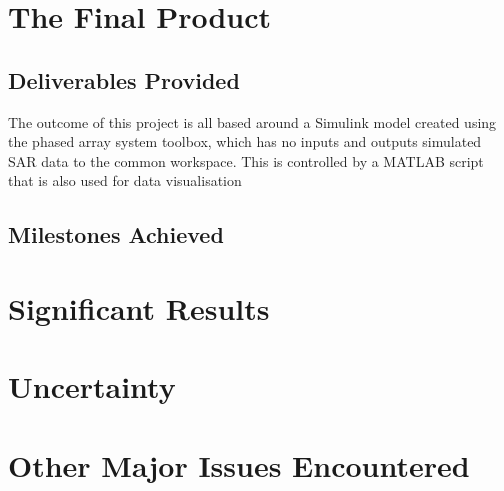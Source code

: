 \section{The Final Product}
\subsection{Deliverables Provided}
The outcome of this project is all based around a Simulink model created using the phased array system toolbox, which has no inputs and outputs simulated SAR data to the common workspace. This is controlled by a MATLAB script that is also used for data visualisation 
\subsection{Milestones Achieved}
\section{Significant Results}
\section{Uncertainty}
\section{Other Major Issues Encountered}
